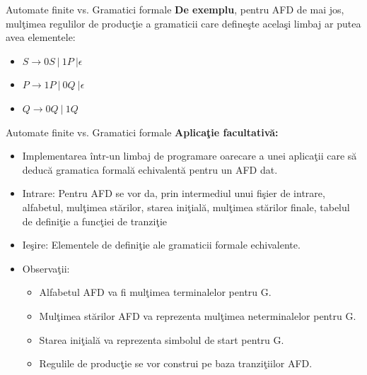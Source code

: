 \documentclass[pdf]{beamer}
\begin{document}
\begin{frame}{Automate finite vs. Gramatici formale}
\textbf{De exemplu}, pentru AFD de mai jos, mulţimea regulilor de producţie a gramaticii care defineşte acelaşi limbaj ar putea avea elementele:

\begin{center}
\end{center}

\begin{itemize}
\item
$S \rightarrow 0S \ | \ 1P \ | \epsilon$
\item
$P \rightarrow 1P \ | \ 0Q \ | \epsilon$
\item
$Q \rightarrow 0Q \ | \ 1Q$
\end{itemize}
\end{frame}



\begin{frame}{Automate finite vs. Gramatici formale}
\textbf{Aplicaţie facultativă:}

\begin{itemize}
\item Implementarea într-un limbaj de programare oarecare a unei aplicaţii care să deducă gramatica formală echivalentă pentru un AFD dat.

\item Intrare: Pentru AFD se vor da, prin intermediul unui fişier de intrare, alfabetul, mulţimea stărilor, starea iniţială, mulţimea stărilor finale, tabelul de definiţie a funcţiei de tranziţie

\item Ieşire: Elementele de definiţie ale gramaticii formale echivalente.

\item Observaţii: 

\begin{itemize}
\item Alfabetul AFD va fi mulţimea terminalelor pentru G.

\item Mulţimea stărilor AFD va reprezenta mulţimea neterminalelor pentru G.

\item Starea iniţială va reprezenta simbolul de start pentru G.

\item Regulile de producţie se vor construi pe baza tranziţiilor AFD.
\end{itemize}
\end{itemize}
\end{frame}
\end{document}
